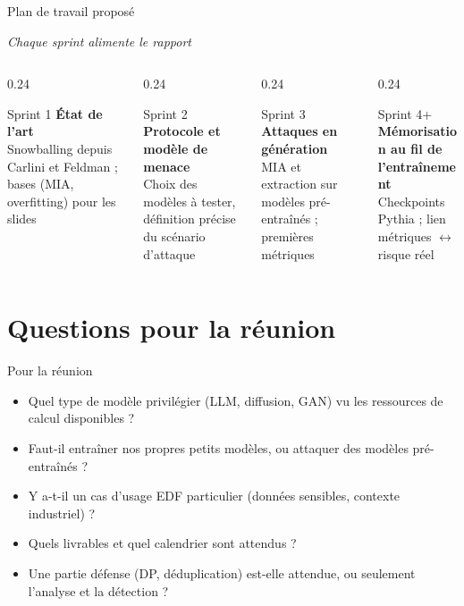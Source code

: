 \documentclass[aspectratio=169, 10pt, table]{beamer}
\newcommand{\subtitleline}[1]{{\small\itshape\color{TSPcyan}#1\par}\vspace{0.2cm}}
\begin{document}
\begin{frame}{Plan de travail proposé}
    \subtitleline{Chaque sprint alimente le rapport}
    
    \begin{columns}[T]
        \begin{column}{0.24\textwidth}
            \begin{block}{Sprint 1}
                \textbf{État de l'art}\\
                Snowballing depuis Carlini et Feldman ; bases (MIA, overfitting) pour les slides
            \end{block}
        \end{column}
        \begin{column}{0.24\textwidth}
            \begin{block}{Sprint 2}
                \textbf{Protocole et modèle de menace}\\
                Choix des modèles à tester, définition précise du scénario d'attaque
            \end{block}
        \end{column}
        \begin{column}{0.24\textwidth}
            \begin{block}{Sprint 3}
                \textbf{Attaques en génération}\\
                MIA et extraction sur modèles pré-entraînés ; premières métriques
            \end{block}
        \end{column}
        \begin{column}{0.24\textwidth}
            \begin{block}{Sprint 4+}
                \textbf{Mémorisation au fil de l'entraînement}\\
                Checkpoints Pythia ; lien métriques $\leftrightarrow$ risque réel
            \end{block}
        \end{column}
    \end{columns}
\end{frame}

\section{Questions pour la réunion}

\begin{frame}{Pour la réunion}
    \begin{itemize}
        \item Quel type de modèle privilégier (LLM, diffusion, GAN) vu les ressources de calcul disponibles ?
        \item Faut-il entraîner nos propres petits modèles, ou attaquer des modèles pré-entraînés ?
        \item Y a-t-il un cas d'usage EDF particulier (données sensibles, contexte industriel) ?
        \item Quels livrables et quel calendrier sont attendus ?
        \item Une partie défense (DP, déduplication) est-elle attendue, ou seulement l'analyse et la détection ?
    \end{itemize}
\end{frame}
\end{document}
